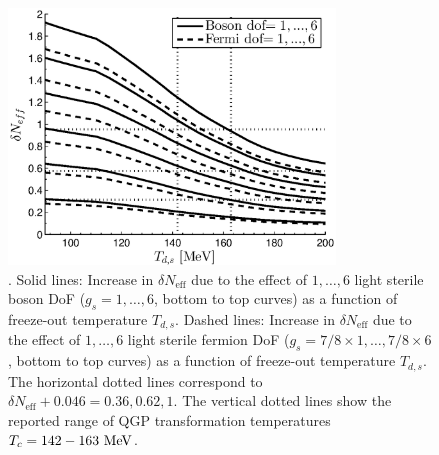 \begin{figure}
\centering
\begin{minipage}[b]{.49\textwidth}
\centerline{\hspace*{0.4cm}\includegraphics[height=6.8cm]{04-birrell/ModelIndStudy/Figures/Neff_Td_combined.eps}}
\end{minipage}
\caption{. Solid lines: Increase in $\delta N_{\text{eff}}$ due to the effect of $1,\dots,6$ light sterile boson DoF ($g_s=1,\dots,6$, bottom to top curves) as a function of freeze-out temperature $T_{d,s}$. Dashed lines: Increase in $\delta N_{\text{eff}}$ due to the effect of $1,\dots,6$ light sterile fermion DoF ($g_s=7/8\times 1,\dots,7/8\times 6$, bottom to top curves) as a function of freeze-out temperature $T_{d,s}$. The horizontal dotted lines correspond to $\delta N_{\text{eff}}+0.046=0.36,0.62,1$. The vertical dotted lines show the reported range of QGP transformation temperatures $T_c=142-163\text{ MeV}$.\label{fig:Neff_Td_zoom}}
\end{figure}


